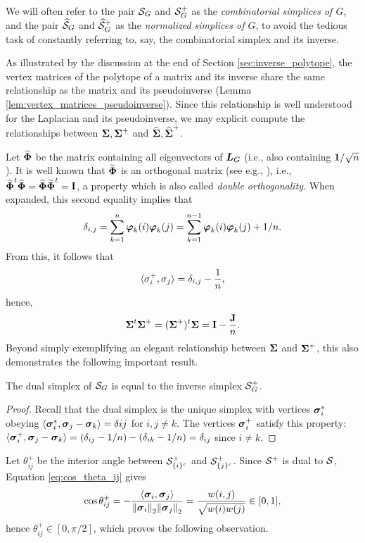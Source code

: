 We will often refer to the pair $\mathcal{S}_G$ and $\mathcal{S}_G^+$ as the \emph{combinatorial simplices of $G$}, and the pair $\widehat{\mathcal{S}}_G$ and $\widehat{\mathcal{S}}_G^+$ as the \emph{normalized simplices of $G$}, to avoid the tedious task of constantly referring to, say, the combinatorial simplex and its inverse. 

As illustrated by the discussion at the end of Section \ref{sec:inverse_polytope}, the vertex matrices of the polytope of a matrix and its inverse share the same relationship as the matrix and its pseudoinverse (Lemma \ref{lem:vertex_matrices_pseudoinverse}). Since this relationship is well understood for the Laplacian and its pseudoinverse, we may explicit compute the relationships between $\boldsymbol{\Sigma},\boldsymbol{\Sigma}^+$ and $\widehat{\boldsymbol{\Sigma}},\widehat{\boldsymbol{\Sigma}}^+$. 

Let $\widetilde{\boldsymbol{\Phi}}$ be the matrix containing all eigenvectors of $\vb*{L}_G$ (i.e., also containing $\vb{1}/\sqrt{n}$).  It is well known that $\widetilde{\boldsymbol{\Phi}}$ is an orthogonal matrix (see e.g., \cite{van2013double}), i.e., $\widetilde{\boldsymbol{\Phi}}^t \widetilde{\boldsymbol{\Phi}}=\widetilde{\boldsymbol{\Phi}}\widetilde{\boldsymbol{\Phi}}^t=\vb{I}$, a property which is also called \emph{double orthogonality}. When expanded, this second equality implies that
\begin{equation*}\delta_{i,j}=\sum_{k=1}^n \vb*{\varphi}_k(i)\vb*{\varphi}_k(j) = \sum_{k=1}^{n-1} \vb*{\varphi}_k(i)\vb*{\varphi}_k(j) + 1/n.
\end{equation*}
From this, it follows that 
\[\langle\sigma_i^+,\sigma_j\rangle = \delta_{i,j} - \frac{1}{n},\]
hence, 
\begin{equation}
\label{eq:sv+sv}
    \boldsymbol{\Sigma}^t\boldsymbol{\Sigma}^+=(\boldsymbol{\Sigma}^+)^t\boldsymbol{\Sigma}=\vb{I}-\frac{\vb{J}}{n}.
\end{equation}
Beyond simply exemplifying an elegant relationship between $\boldsymbol{\Sigma}$ and $\boldsymbol{\Sigma}^+$, this also demonstrates the following important result. 

\begin{observation}
	\label{obs:inverse_is_dual}
	The dual simplex of $\mathcal{S}_G$ is equal to the inverse simplex $\mathcal{S}_G^+$. 
\end{observation}
\begin{proof}
	Recall that the dual simplex is the unique simplex with vertices $\vb*{\sigma}_i^*$ obeying $\langle \vb*{\sigma}_i^*,\vb*{\sigma}_j-\vb*{\sigma}_k\rangle = \delta{ij}$ for $i,j\neq k$. The vertices $\vb*{\sigma}_i^+$ satisfy this property: $\langle \vb*{\sigma}_i^+,\vb*{\sigma}_j-\vb*{\sigma}_k\rangle = (\delta_{ij}-1/n) - (\delta_{ik} - 1/n) = \delta_{ij}$ since $i\neq k$. 
\end{proof}
Let $\theta^+_{ij}$ be the interior angle between $\mathcal{S}^+_{\{i\}^c}$ and $\mathcal{S}^+_{\{j\}^c}$. Since $\mathcal{S}^+$ is dual to $\mathcal{S}$, Equation \ref{eq:cos_theta_ij} gives 
\[\cos\theta_{ij}^+ = - \frac{\langle \vb*{\sigma}_i,\vb*{\sigma}_j\rangle}{\norm{\vb*{\sigma}_i}_2\norm{\vb*{\sigma}_j}_2} = \frac{w(i,j)}{\sqrt{w(i)w(j)}}\in[0,1],\]
hence $\theta^+_{ij}\in[0,\pi/2]$, which proves the following observation. 

